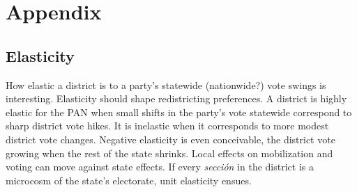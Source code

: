 \documentclass[letter,12pt]{article}
\begin{document}







\section*{Appendix} 

\subsection*{Elasticity}


How elastic a district is to a party's statewide (nationwide?) vote swings is interesting. Elasticity should shape redistricting preferences. A district is highly elastic for the PAN when small shifts in the party's vote statewide correspond to sharp district vote hikes. It is inelastic when it corresponds to more modest district vote changes. Negative elasticity is even conceivable, the district vote growing when the rest of the state shrinks. Local effects on mobilization and voting can move against state effects. If every \emph{secci\'on} in the district is a microcosm of the state's electorate, unit elasticity ensues. 
\end{document}
